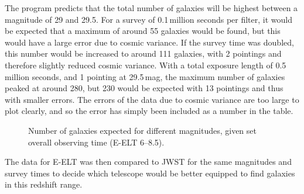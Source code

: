 		The program predicts that the total number of galaxies will be highest between a magnitude of 29 and 29.5. For a survey of 0.1\,million seconds per filter, it would be expected that a maximum of around 55 galaxies would be found, but this would have a large error due to cosmic variance. If the survey time was doubled, this number would be increased to around 111 galaxies, with 2 pointings and therefore slightly reduced cosmic variance. With a total exposure length of 0.5\,million seconds, and 1 pointing at 29.5\,mag, the maximum number of galaxies peaked at around 280, but 230 would be expected with 13 pointings and thus with smaller errors. The errors of the data due to cosmic variance are too large to plot clearly, and so the error has simply been included as a number in the table.
		\begin{figure}[!htbp]
			\centering
				\begingroup{}
					\resizebox{0.8\textwidth}{!}{%
						
					}\endgroup
			\caption{Number of galaxies expected for different magnitudes, given set overall observing time (E-ELT 6--8.5).\label{fig:alpha_evolution}}
		\end{figure}

		The data for E-ELT was then compared to JWST for the same magnitudes and survey times to decide which telescope would be better equipped to find galaxies in this redshift range.

